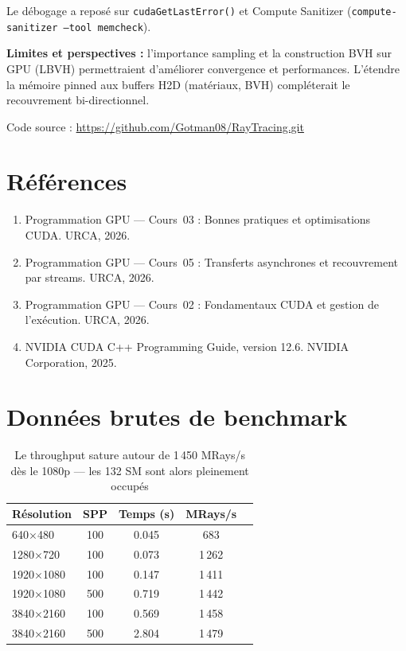 \documentclass[12pt,a4paper]{article}
\begin{document}
Le d\'{e}bogage a repos\'{e} sur \texttt{cudaGetLastError()} et Compute Sanitizer (\texttt{compute-sanitizer --tool memcheck}).

\textbf{Limites et perspectives :} l'importance sampling et la construction BVH sur GPU (LBVH) permettraient d'am\'{e}liorer convergence et performances. L'\'{e}tendre la m\'{e}moire pinned aux buffers H2D (mat\'{e}riaux, BVH) compl\'{e}terait le recouvrement bi-directionnel.

Code source : \url{https://github.com/Gotman08/RayTracing.git}

\section*{R\'{e}f\'{e}rences}

\begin{enumerate}
    \item[{[1]}] Programmation GPU --- Cours~03 : Bonnes pratiques et optimisations CUDA. URCA, 2026.
    \item[{[2]}] Programmation GPU --- Cours~05 : Transferts asynchrones et recouvrement par streams. URCA, 2026.
    \item[{[3]}] Programmation GPU --- Cours~02 : Fondamentaux CUDA et gestion de l'ex\'{e}cution. URCA, 2026.
    \item[{[4]}] NVIDIA CUDA C++ Programming Guide, version 12.6. NVIDIA Corporation, 2025.
\end{enumerate}

\appendix
\section{Donn\'{e}es brutes de benchmark}

\begin{table}[H]
\centering
\caption{Le throughput sature autour de 1\,450 MRays/s d\`{e}s le 1080p --- les 132 SM sont alors pleinement occup\'{e}s}
\begin{tabular}{lcccc}
\toprule
\textbf{R\'{e}solution} & \textbf{SPP} & \textbf{Temps (s)} & \textbf{MRays/s} \\
\midrule
640$\times$480 & 100 & 0.045 & 683 \\
1280$\times$720 & 100 & 0.073 & 1\,262 \\
1920$\times$1080 & 100 & 0.147 & 1\,411 \\
1920$\times$1080 & 500 & 0.719 & 1\,442 \\
3840$\times$2160 & 100 & 0.569 & 1\,458 \\
3840$\times$2160 & 500 & 2.804 & 1\,479 \\
\bottomrule
\end{tabular}
\label{tab:benchmarks_romeo_gpu}
\end{table}
\end{document}
